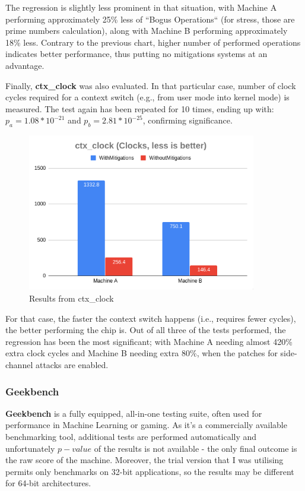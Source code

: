 \documentclass{csfourzero}
\begin{document}
The regression is slightly less prominent in that situation, with Machine A performing approximately 25\% less of ``Bogus Operations`` (for stress, those are prime numbers calculation), along with Machine B performing approximately 18\% less. Contrary to the previous chart, higher number of performed operations indicates better performance, thus putting no mitigations systems at an advantage.   

Finally, \textbf{ctx\_clock} was also evaluated. In that particular case, number of clock cycles required for a context switch (e.g., from user mode into kernel mode) is measured. The test again has been repeated for 10 times, ending up with: $p_{a} = 1.08 * 10^{-21}$ and $p_{b} = 2.81 * 10^{-25}$, confirming significance.

\begin{figure}[h]
\centering
\includegraphics[width=10cm]{ctx}
\caption{Results from ctx\_clock}
\label{fig:ctx}
\end{figure}

For that case, the faster the context switch happens (i.e., requires fewer cycles), the better performing the chip is. Out of all three of the tests performed, the regression has been the most significant; with Machine A needing almost 420\% extra clock cycles and Machine B needing extra 80\%, when the patches for side-channel attacks are enabled.

\subsubsection{Geekbench}

\textbf{Geekbench} is a fully equipped, all-in-one testing suite, often used for performance in Machine Learning or gaming. As it's a commercially available benchmarking tool, additional tests are performed automatically and unfortunately $p-value$ of the results is not available - the only final outcome is the raw score of the machine. Moreover, the trial version that I was utilising permits only benchmarks on 32-bit applications, so the results may be different for 64-bit architectures.
\end{document}
